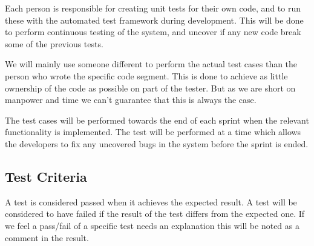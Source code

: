 Each person is responsible for creating unit tests for their own code, and to run these with the automated test framework during development. This will be done to perform continuous testing of the system, and uncover if any new code break some of the previous tests.

We will mainly use someone different to perform the actual test cases than the person who wrote the specific code segment. This is done to achieve as little ownership of the code as possible on part of the tester. But as we are short on manpower and time we can’t guarantee that this is always the case. 

The test cases will be performed towards the end of each sprint when the relevant functionality is implemented. The test will be performed at a time which allows the developers to fix any uncovered bugs in the system before the sprint is ended. 

\subsection{Test Criteria}
A test is considered passed when it achieves the expected result. A test will be considered to have failed if the result of the test differs from the expected one. If we feel a pass/fail of a specific test needs an explanation this will be noted as a comment in the result.